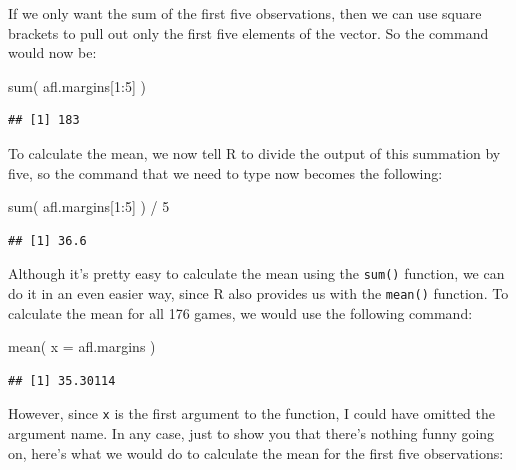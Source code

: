 \documentclass[
]{book}
\newenvironment{Shaded}{\begin{snugshade}}{\end{snugshade}}
\newcommand{\AttributeTok}[1]{\textcolor[rgb]{0.77,0.63,0.00}{#1}}
\newcommand{\DecValTok}[1]{\textcolor[rgb]{0.00,0.00,0.81}{#1}}
\newcommand{\FunctionTok}[1]{\textcolor[rgb]{0.00,0.00,0.00}{#1}}
\newcommand{\NormalTok}[1]{#1}
\newcommand{\SpecialCharTok}[1]{\textcolor[rgb]{0.00,0.00,0.00}{#1}}
\begin{document}
If we only want the sum of the first five observations, then we can use square brackets to pull out only the first five elements of the vector. So the command would now be:

\begin{Shaded}
\begin{Highlighting}[]
\FunctionTok{sum}\NormalTok{( afl.margins[}\DecValTok{1}\SpecialCharTok{:}\DecValTok{5}\NormalTok{] )}
\end{Highlighting}
\end{Shaded}

\begin{verbatim}
## [1] 183
\end{verbatim}

To calculate the mean, we now tell R to divide the output of this summation by five, so the command that we need to type now becomes the following:

\begin{Shaded}
\begin{Highlighting}[]
\FunctionTok{sum}\NormalTok{( afl.margins[}\DecValTok{1}\SpecialCharTok{:}\DecValTok{5}\NormalTok{] ) }\SpecialCharTok{/} \DecValTok{5}
\end{Highlighting}
\end{Shaded}

\begin{verbatim}
## [1] 36.6
\end{verbatim}

Although it's pretty easy to calculate the mean using the \texttt{sum()} function, we can do it in an even easier way, since R also provides us with the \texttt{mean()} function. To calculate the mean for all 176 games, we would use the following command:

\begin{Shaded}
\begin{Highlighting}[]
\FunctionTok{mean}\NormalTok{( }\AttributeTok{x =}\NormalTok{ afl.margins )}
\end{Highlighting}
\end{Shaded}

\begin{verbatim}
## [1] 35.30114
\end{verbatim}

However, since \texttt{x} is the first argument to the function, I could have omitted the argument name. In any case, just to show you that there's nothing funny going on, here's what we would do to calculate the mean for the first five observations:
\end{document}
